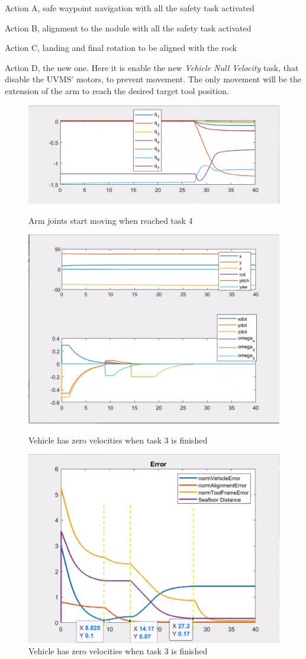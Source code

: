 \documentclass{article}
\begin{document}
\begin{description}
	\item Action A, safe waypoint navigation with all the safety task activated
	\item Action B, alignment to the nodule with all the safety task activated
	\item Action C, landing and final rotation to be aligned with the rock
	\item Action D, the new one. Here it is enable the new \textit{Vehicle Null Velocity} task, that disable the UVMS' motors, to prevent movement. The only movement will be the extension of the arm to reach the desired target tool position. 
\end{description}

\begin{figure}[htp]
\centering
\includegraphics[width=.6\textwidth]{411_q.png}\caption{Arm joints start moving when reached task 4}
\centering
\label{fig:411_arm}
\includegraphics[width=.6\textwidth]{411_ppdot.png}\caption{Vehicle has zero velocities when task 3 is finished}
\label{fig:411_vehicle}
\includegraphics[width=.6\textwidth]{411_Errors.png}\caption{Vehicle has zero velocities when task 3 is finished}
\label{fig:411_errors}
\end{figure}
\end{document}
